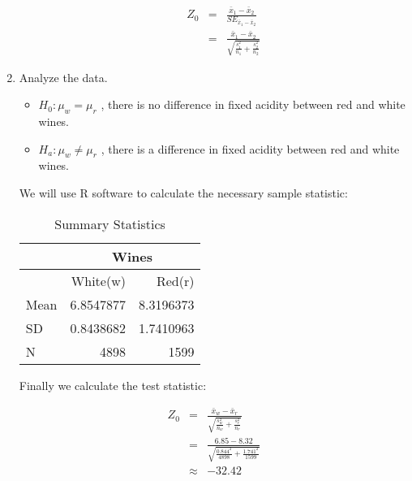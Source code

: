\documentclass[11pt]{book}\usepackage[]{graphicx}\usepackage[]{color}
\begin{document}
\begin{enumerate}
\begin{itemize}
    \begin{eqnarray*}
    Z_0 &=& \frac{ \bar{x}_1 - \bar{x}_2}{SE_{\bar{x}_1 - \bar{x}_2}} \\
      &=& \frac{ \bar{x}_1 - \bar{x}_2}{ \sqrt{ \frac{s_1^2}{n_1} + \frac{s_2^2}{n_2}} }
   \end{eqnarray*} 

  \end{itemize}
  
\item Analyze the data.

  \begin{itemize}
  \item $H_0: \mu_w = \mu_r$ ,    there is no difference in fixed acidity between red and white wines. 
  \item $H_a: \mu_w \ne \mu_r$ ,  there is a difference in fixed acidity between red and white wines. 
  \end{itemize}
  
  We will use R software to calculate the necessary sample statistic:
 
\begin{table}[htbp]
   \centering
   \caption{Summary Statistics}
   \begin{tabular}{@{} lrr @{}}  \hline %
      & \multicolumn{2}{c}{Wines } \\
      \hline 
          & White(w)  & Red(r)  \\ \hline
      Mean & 6.8547877 & 8.3196373 \\
      SD   & 0.8438682 & 1.7410963 \\
      N    & 4898  & 1599  \\ \hline
   \end{tabular}
   
   \label{tab:tbwines}
\end{table} 

Finally we calculate the test statistic:

  \begin{eqnarray*}
  Z_0 &=& \frac{ \bar{x}_w - \bar{x}_r}{ \sqrt{ \frac{s_w^2}{n_w} + \frac{s_r^2}{n_r}}} \\
    &=& \frac{ 6.85 - 8.32 }{ \sqrt{ \frac{0.844^2 }{4898} + \frac{1.741^2}{1599}}} \\
    &\approx& -32.42 
   \end{eqnarray*} 
   

\end{enumerate}
\end{document}
